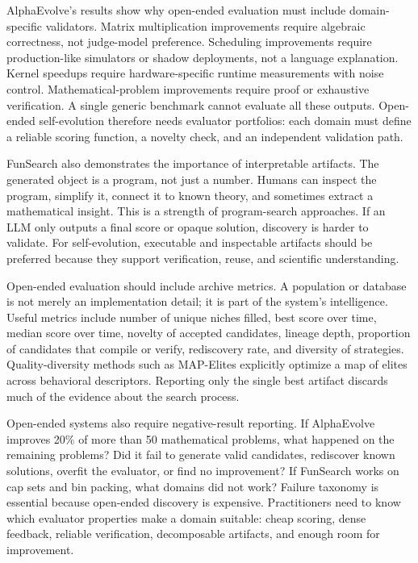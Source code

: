 AlphaEvolve's results show why open-ended evaluation must include domain-specific validators. Matrix multiplication improvements require algebraic correctness, not judge-model preference. Scheduling improvements require production-like simulators or shadow deployments, not a language explanation. Kernel speedups require hardware-specific runtime measurements with noise control. Mathematical-problem improvements require proof or exhaustive verification. A single generic benchmark cannot evaluate all these outputs. Open-ended self-evolution therefore needs evaluator portfolios: each domain must define a reliable scoring function, a novelty check, and an independent validation path.

FunSearch also demonstrates the importance of interpretable artifacts. The generated object is a program, not just a number. Humans can inspect the program, simplify it, connect it to known theory, and sometimes extract a mathematical insight. This is a strength of program-search approaches. If an LLM only outputs a final score or opaque solution, discovery is harder to validate. For self-evolution, executable and inspectable artifacts should be preferred because they support verification, reuse, and scientific understanding.

Open-ended evaluation should include archive metrics. A population or database is not merely an implementation detail; it is part of the system's intelligence. Useful metrics include number of unique niches filled, best score over time, median score over time, novelty of accepted candidates, lineage depth, proportion of candidates that compile or verify, rediscovery rate, and diversity of strategies. Quality-diversity methods such as MAP-Elites explicitly optimize a map of elites across behavioral descriptors. Reporting only the single best artifact discards much of the evidence about the search process.

Open-ended systems also require negative-result reporting. If AlphaEvolve improves 20\% of more than 50 mathematical problems, what happened on the remaining problems? Did it fail to generate valid candidates, rediscover known solutions, overfit the evaluator, or find no improvement? If FunSearch works on cap sets and bin packing, what domains did not work? Failure taxonomy is essential because open-ended discovery is expensive. Practitioners need to know which evaluator properties make a domain suitable: cheap scoring, dense feedback, reliable verification, decomposable artifacts, and enough room for improvement.

